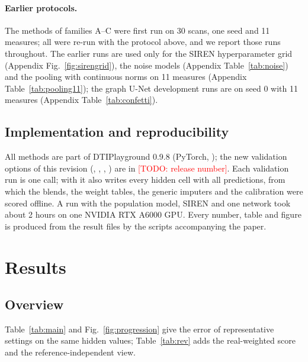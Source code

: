 \documentclass[11pt]{article}
\newcommand{\todo}[1]{\textcolor{red}{[TODO: #1]}}
\newcommand{\ratio}{\ensuremath{\rho}}
\begin{document}
\paragraph{Earlier protocols.} The methods of families A--C were first run on 30 scans, one seed and 11 measures; all were
re-run with the protocol above, and we report those runs throughout. The earlier runs are used only for the SIREN
hyperparameter grid (Appendix Fig.~\ref{fig:sirengrid}), the noise models (Appendix Table~\ref{tab:noise}) and the
pooling with continuous norms on 11 measures (Appendix Table~\ref{tab:pooling11}); the graph U-Net development runs are on
seed 0 with 11 measures (Appendix Table~\ref{tab:confetti}).

\subsection{Implementation and reproducibility}

All methods are part of DTIPlayground 0.9.8 \citep{dtiplayground} (PyTorch, \citealp{paszke2019pytorch}); the new
validation options of this revision (, ,
, ) are in \todo{release number}. Each validation run is
one  call; with  it also writes every
hidden cell with all predictions, from which the blends, the weight tables, the generic imputers and the calibration were
scored offline. A run with the population model, SIREN and one network took about 2 hours on one NVIDIA RTX A6000 GPU.
Every number, table and figure is produced from the result files by the scripts accompanying the paper.

\section{Results}

\subsection{Overview}

Table~\ref{tab:main} and Fig.~\ref{fig:progression} give the error of representative settings on the same hidden
values; Table~\ref{tab:rev} adds the real-weighted score and the reference-independent view.

\begin{table}[p]
\centering\footnotesize
\caption{Error relative to the age-bin mean (RMSE ratio $\ratio$; below 1: better) on identical hidden values, mean over
3 seeds $\times$ 54 BCP scans, 7 measures and 3 age bins. Overall: mean of the four patterns (SD between seeds).
$^{\dagger}$Leaves some hidden values, counted with the age-bin mean (families A--B never fill a whole family).
$^{\ast}$Weights cross-fitted by subject; mean of the per-seed scores (pooled over seeds as in the software
documentation: 0.567 and 0.538).}\label{tab:main}
\setlength{\tabcolsep}{4pt}
\resizebox{\textwidth}{!}{}
\end{table}
\end{document}
